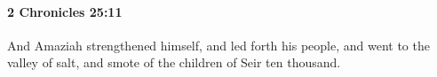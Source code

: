
		\paragraph{2 Chronicles 25:11} %
			\label{2CHRONICLES-25-11}

			And Amaziah strengthened himself, and led forth his people, and went to the valley of salt, and smote of the children of Seir ten thousand.


